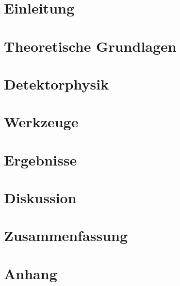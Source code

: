 \documentclass[bachelor,       %
               twoside,        %
               BCOR10mm,       %
              english,ngerman, %
               ]{GAUBM}
\begin{document}
\mainmatter   %

\chapter{Einleitung}

\chapter{\lhc}

\chapter{Theoretische Grundlagen}

\chapter{Detektorphysik}

\chapter{Werkzeuge}

\chapter{Ergebnisse}
\chapter{Diskussion}
\chapter{Zusammenfassung}

\appendix
\chapter{Anhang}


\cleardoublepage
 


\end{document}
